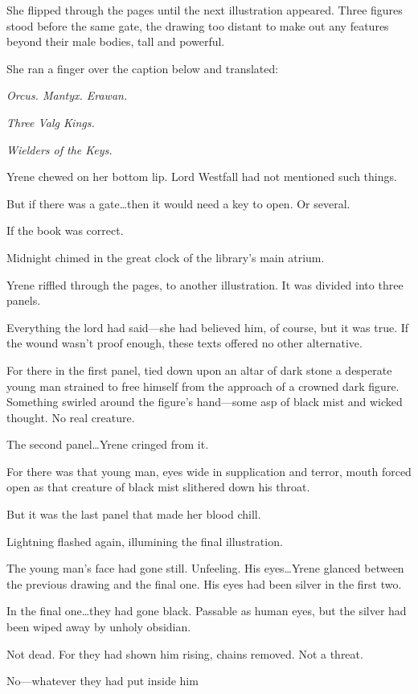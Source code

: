 She flipped through the pages until the next illustration appeared.
Three figures stood before the same gate, the drawing too distant to make out any features beyond their male bodies, tall and powerful.

She ran a finger over the caption below and translated:

\emph{Orcus.
Mantyx.
Erawan.}

\emph{Three Valg Kings.}

\emph{Wielders of the Keys.}

Yrene chewed on her bottom lip.
Lord Westfall had not mentioned such things.

But if there was a gate\ldots then it would need a key to open.
Or several.

If the book was correct.

Midnight chimed in the great clock of the library's main atrium.

Yrene riffled through the pages, to another illustration.
It was divided into three panels.

Everything the lord had said---she had believed him, of course, but  it was true.
If the wound wasn't proof enough, these texts offered no other alternative.

For there in the first panel, tied down upon an altar of dark stone  a desperate young man strained to free himself from the approach of a crowned dark figure.
Something swirled around the figure's hand---some asp of black mist and wicked thought.
No real creature.

The second panel\ldots Yrene cringed from it.

For there was that young man, eyes wide in supplication and terror, mouth forced open as that creature of black mist slithered down his throat.

But it was the last panel that made her blood chill.

Lightning flashed again, illumining the final illustration.

The young man's face had gone still.
Unfeeling.
His eyes\ldots Yrene glanced between the previous drawing and the final one.
His eyes had been silver in the first two.

In the final one\ldots they had gone black.
Passable as human eyes, but the silver had been wiped away by unholy obsidian.

Not dead.
For they had shown him rising, chains removed.
Not a threat.

No---whatever they had put inside him 

